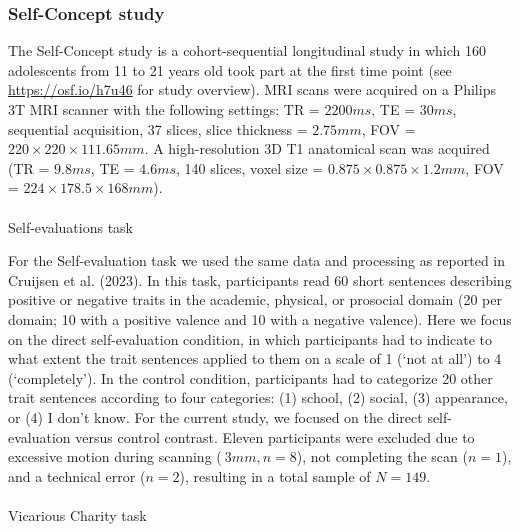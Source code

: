 \documentclass[
  letterpaper,
  DIV=11,
  numbers=noendperiod]{scrartcl}
\makeatletter
\let\oldparagraph\paragraph
\renewcommand{\paragraph}{
    \@ifstar
      \xxxParagraphStar
      \xxxParagraphNoStar
  }
\newcommand{\xxxParagraphStar}[1]{\oldparagraph*{#1}\mbox{}}
\newcommand{\xxxParagraphNoStar}[1]{\oldparagraph{#1}\mbox{}}
\makeatother
\begin{document}
\subsubsection{Self-Concept study}\label{self-concept-study}

The Self-Concept study is a cohort-sequential longitudinal study in
which 160 adolescents from 11 to 21 years old took part at the first
time point (see \url{https://osf.io/h7u46} for study overview). MRI
scans were acquired on a Philips 3T MRI scanner with the following
settings: TR = \(2200 ms\), TE = \(30 ms\), sequential acquisition, 37
slices, slice thickness = \(2.75 mm\), FOV = \(220 × 220 × 111.65 mm\).
A high-resolution 3D T1 anatomical scan was acquired (TR = \(9.8 ms\),
TE = \(4.6 ms\), 140 slices, voxel size = \(0.875 × 0.875 × 1.2 mm\),
FOV = \(224 × 178.5 × 168 mm\)).

\paragraph{Self-evaluations task}\label{self-evaluations-task}

For the Self-evaluation task we used the same data and processing as
reported in Cruijsen et al. (2023). In this task, participants read 60
short sentences describing positive or negative traits in the academic,
physical, or prosocial domain (20 per domain; 10 with a positive valence
and 10 with a negative valence). Here we focus on the direct
self-evaluation condition, in which participants had to indicate to what
extent the trait sentences applied to them on a scale of 1 (`not at
all') to 4 (`completely'). In the control condition, participants had to
categorize 20 other trait sentences according to four categories: (1)
school, (2) social, (3) appearance, or (4) I don't know. For the current
study, we focused on the direct self-evaluation versus control contrast.
Eleven participants were excluded due to excessive motion during
scanning (\(\>3 mm, n = 8\)), not completing the scan (\(n = 1\)), and a
technical error (\(n = 2\)), resulting in a total sample of \(N = 149\).

\paragraph{Vicarious Charity task}\label{vicarious-charity-task}
\end{document}
